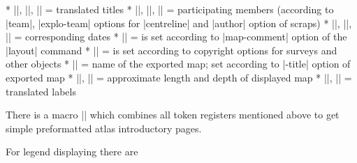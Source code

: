 \list
* |\explotitle|, |\topotitle|, |\cartotitle| = translated titles
* |\exploteam|, |\topoteam|, |\cartoteam| = participating members 
  (according to |team|, |explo-team| options for |centreline| and |author|
  option of scraps)
* |\explodate|, |\topodate|, |\cartodate| = corresponding dates 
* |\comment| = is set according to |map-comment| option of the |layout|
  command
* |\copyrights| = is set according to copyright options for surveys and other
  objects
* |\cavename| = name of the exported map; set according to |-title| option
  of exported map
* |\cavelength|, |\cavedepth| = approximate length and depth of displayed map
* |\cavelengthtitle|, |\cavedepthtitle| = translated labels
\endlist

There is a macro |\atlastitlepages| which combines all token registers 
mentioned above to get simple preformatted atlas introductory pages.

For legend displaying there are

